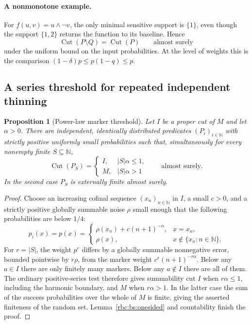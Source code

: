 \documentclass[11pt]{article}
\numberwithin{equation}{section}
\newtheorem{proposition}[theorem]{Proposition}
\theoremstyle{definition}
\theoremstyle{remark}
\newcommand{\N}{\mathbb N}
\newcommand{\Cut}{\operatorname{Cut}}
\begin{document}
\paragraph{A nonmonotone example.}
For $f(u,v)=u\wedge\neg v$, the only minimal sensitive support is
$\{1\}$, even though the support $\{1,2\}$ returns the function to its
baseline.  Hence
\[
  \Cut(P\setminus Q)=\Cut(P)
  \qquad\text{almost surely}
\]
under the uniform bound on the input probabilities.  At the level of
weights this is the comparison
$(1-\delta)p\leq p(1-q)\leq p$.

\subsection{A series threshold for repeated independent thinning}

\begin{proposition}[Power-law marker threshold]
\label{rbc:bs:power-law}
Let $I$ be a proper cut of $M$ and let $\alpha>0$.  There are independent,
identically distributed predicates $(P_i)_{i\in\N}$ with strictly
positive uniformly small probabilities such that, simultaneously for
every nonempty finite $S\subseteq\N$,
\[
  \Cut(P_S)=
  \begin{cases}
    I,& |S|\alpha\leq1,\\
    M,& |S|\alpha>1
  \end{cases}
  \qquad\text{almost surely}.
\]
In the second case $P_S$ is externally finite almost surely.
\end{proposition}

\begin{proof}
Choose an increasing cofinal sequence $(x_n)_{n\in\N}$ in $I$, a small
$c>0$, and a strictly positive globally summable noise $\rho$ small enough
that the following probabilities are below $1/4$:
\[
  p_i(x)=p(x)=
  \begin{cases}
     \rho(x_n)+c(n+1)^{-\alpha},&x=x_n,\\
     \rho(x),&x\notin\{x_n:n\in\N\}.
  \end{cases}
\]
For $r=|S|$, the weight $p^r$ differs by a globally summable nonnegative
error, bounded pointwise by $r\rho$, from the marker weight
$c^r(n+1)^{-r\alpha}$.  Below any $a\in I$ there are only finitely many
markers.  Below any $a\notin I$ there are all of them.  The ordinary
positive-series test therefore gives summability cut $I$ when
$r\alpha\leq1$, including the harmonic boundary, and $M$ when
$r\alpha>1$.  In the latter case the sum of the success probabilities
over the whole of $M$ is finite, giving the asserted finiteness of the
random set.  Lemma~\ref{rbc:bs:onesided} and countability finish the proof.
\end{proof}
\end{document}
